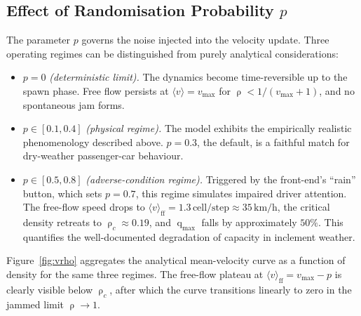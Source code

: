 \documentclass[11pt,a4paper]{article}
\DeclareMathOperator{\flow}{q}
\DeclareMathOperator{\dens}{\rho}
\begin{document}
\subsection{Effect of Randomisation Probability $p$}

The parameter $p$ governs the noise injected into the velocity update.
Three operating regimes can be distinguished from purely analytical
considerations:
\begin{itemize}[leftmargin=1.6em]
\item $p=0$ \emph{(deterministic limit).} The dynamics become
      time-reversible up to the spawn phase. Free flow persists at
      $\langle v\rangle = v_{\max}$ for $\dens < 1/(v_{\max}+1)$, and
      no spontaneous jam forms.
\item $p \in [0.1,0.4]$ \emph{(physical regime).} The model exhibits
      the empirically realistic phenomenology described above.
      $p=0.3$, the default, is a faithful match for dry-weather
      passenger-car behaviour.
\item $p \in [0.5,0.8]$ \emph{(adverse-condition regime).} Triggered by
      the front-end's ``rain'' button, which sets $p=0.7$, this regime
      simulates impaired driver attention. The free-flow speed drops
      to $\langle v\rangle_{\text{ff}} = 1.3\,\text{cell/step} \approx
      35\,\text{km/h}$, the critical density retreats to
      $\dens_c \approx 0.19$, and $\flow_{\max}$ falls by approximately
      $50\%$. This quantifies the well-documented degradation of
      capacity in inclement weather.
\end{itemize}

Figure~\ref{fig:vrho} aggregates the analytical mean-velocity curve as
a function of density for the same three regimes. The free-flow
plateau at $\langle v\rangle_{\text{ff}}=v_{\max}-p$ is clearly visible
below $\dens_c$, after which the curve transitions linearly to zero in
the jammed limit $\dens\to 1$.
\end{document}
